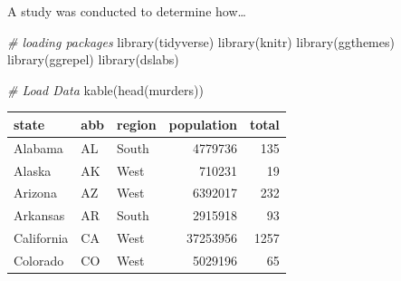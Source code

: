 \documentclass[
]{article}
\newenvironment{Shaded}{\begin{snugshade}}{\end{snugshade}}
\newcommand{\CommentTok}[1]{\textcolor[rgb]{0.56,0.35,0.01}{\textit{#1}}}
\newcommand{\FunctionTok}[1]{\textcolor[rgb]{0.00,0.00,0.00}{#1}}
\newcommand{\NormalTok}[1]{#1}
\begin{document}
A study was conducted to determine how\ldots{}

\begin{Shaded}
\begin{Highlighting}[]
\CommentTok{\# loading packages }
\FunctionTok{library}\NormalTok{(tidyverse)}
\FunctionTok{library}\NormalTok{(knitr)}
\FunctionTok{library}\NormalTok{(ggthemes)}
\FunctionTok{library}\NormalTok{(ggrepel)}
\FunctionTok{library}\NormalTok{(dslabs)}
\end{Highlighting}
\end{Shaded}

\begin{Shaded}
\begin{Highlighting}[]
\CommentTok{\# Load Data}
\FunctionTok{kable}\NormalTok{(}\FunctionTok{head}\NormalTok{(murders))}
\end{Highlighting}
\end{Shaded}

\begin{longtable}[]{@{}lllrr@{}}
\toprule()
state & abb & region & population & total \\
\midrule()
\endhead
Alabama & AL & South & 4779736 & 135 \\
Alaska & AK & West & 710231 & 19 \\
Arizona & AZ & West & 6392017 & 232 \\
Arkansas & AR & South & 2915918 & 93 \\
California & CA & West & 37253956 & 1257 \\
Colorado & CO & West & 5029196 & 65 \\
\bottomrule()
\end{longtable}
\end{document}
